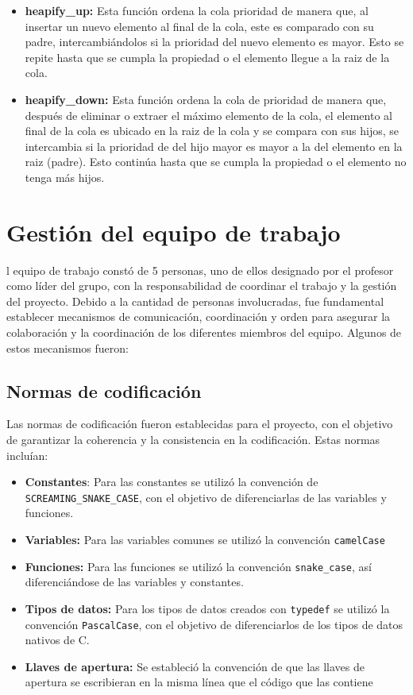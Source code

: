 \documentclass[9pt,letterpaper,onecolumn]{rho-class/rho}
\begin{document}
    \begin{itemize}
        \item \textbf{heapify\_up:} Esta función ordena la cola prioridad de manera que, al insertar un nuevo elemento al final de la cola, este es comparado con su padre, intercambiándolos si la prioridad del nuevo elemento es mayor. Esto se repite hasta que se cumpla la propiedad o el elemento llegue a la raiz de la cola.
        \item \textbf{heapify\_down:} Esta función ordena la cola de prioridad de manera que, después de eliminar o extraer el máximo elemento de la cola, el elemento al final de la cola es ubicado en la raiz de la cola y se compara con sus hijos, se intercambia si la prioridad de del hijo mayor es mayor a la del elemento en la raiz (padre). Esto continúa hasta que se cumpla la propiedad o el elemento no tenga más hijos.
    \end{itemize}

\newpage
\section{Gestión del equipo de trabajo}
    l equipo de trabajo constó de 5 personas, uno de ellos designado por el profesor como líder del grupo, con la responsabilidad de coordinar el trabajo y la gestión del proyecto. Debido a la cantidad de personas involucradas, fue fundamental establecer mecanismos de comunicación, coordinación y orden para asegurar la colaboración y la coordinación de los diferentes miembros del equipo. Algunos de estos mecanismos fueron:

    \subsection{Normas de codificación}

        Las normas de codificación fueron establecidas para el proyecto, con el objetivo de garantizar la coherencia y la consistencia en la codificación. Estas normas incluían:

        \begin{itemize}
            \item \textbf{Constantes}: Para las constantes se utilizó la convención de \texttt{SCREAMING\_SNAKE\_CASE}, con el objetivo de diferenciarlas de las variables y funciones.
            \item \textbf{Variables:} Para las variables comunes se utilizó la convención \texttt{camelCase}
            \item \textbf{Funciones:} Para las funciones se utilizó la convención \texttt{snake\_case}, así diferenciándose de las variables y constantes.
            \item \textbf{Tipos de datos:} Para los tipos de datos creados con \texttt{typedef} se utilizó la convención \texttt{PascalCase}, con el objetivo de diferenciarlos de los tipos de datos nativos de C.
            \item \textbf{Llaves de apertura:} Se estableció la convención de que las llaves de apertura se escribieran en la misma línea que el código que las contiene
        \end{itemize}
\end{document}
